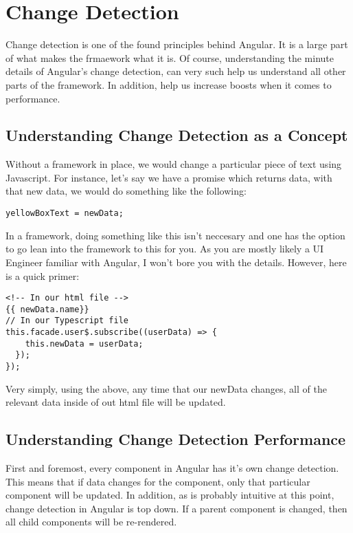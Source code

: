 \section{ Change Detection }
\maketitle{}

Change detection is one of the found principles behind Angular. It is a large
part of what makes the frmaework what it is. Of course, understanding the
minute details of Angular's change detection, can very such help us understand
all other parts of the framework. In addition, help us increase boosts when it
comes to performance.

\subsection{Understanding Change Detection as a Concept}
Without a framework in place, we would change a particular piece of text
using Javascript. For instance, let's say we have a promise which returns data,
with that new data, we would do something like the following:

\begin{lstlisting}
yellowBoxText = newData;
\end{lstlisting}

In a framework, doing something like this isn't neccesary and one has the option
to go lean into the framework to this for you. As you are mostly likely a UI
Engineer familiar with Angular, I won't bore you with the details. However, here
is a quick primer:
\begin{lstlisting}
<!-- In our html file -->
{{ newData.name}}
// In our Typescript file
this.facade.user$.subscribe((userData) => {
    this.newData = userData;
  });
});
\end{lstlisting}

Very simply, using the above, any time that our newData changes, all of the
relevant data inside of out html file will be updated.

\subsection{ Understanding Change Detection Performance }
First and foremost, every component in Angular has it's own change detection.
This means that if data changes for the component, only that particular
component will be updated. In addition, as is probably intuitive at this point,
change detection in Angular is top down. If a parent component is changed, then
all child components will be re-rendered.

